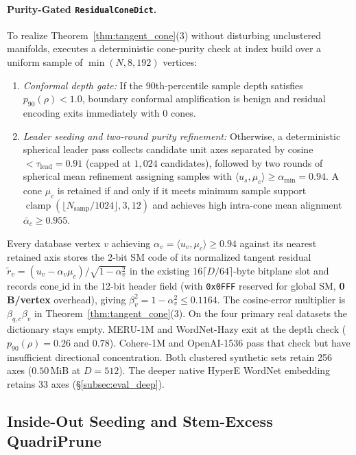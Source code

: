 \paragraph{Purity-Gated \texttt{ResidualConeDict}.}
To realize Theorem~\ref{thm:tangent_cone}(3) without disturbing unclustered manifolds, \rquiver{} executes a deterministic cone-purity check at index build over a uniform sample of $\min(N, 8{,}192)$ vertices:
\begin{enumerate}
  \item \emph{Conformal depth gate:} If the 90th-percentile sample depth satisfies $p_{90}(\rho) < 1.0$, boundary conformal amplification is benign and residual encoding exits immediately with $0$ cones.
  \item \emph{Leader seeding and two-round purity refinement:} Otherwise, a deterministic spherical leader pass collects candidate unit axes separated by cosine $< \tau_{\mathrm{lead}} = 0.91$ (capped at $1{,}024$ candidates), followed by two rounds of spherical mean refinement assigning samples with $\langle u_s, \mu_c\rangle \ge \alpha_{\min} = 0.94$.
  A cone $\mu_c$ is retained if and only if it meets minimum sample support $\operatorname{clamp}(\lfloor N_{\mathrm{samp}}/1024\rfloor, 3, 12)$ and achieves high intra-cone mean alignment $\bar{\alpha}_c \ge 0.955$.
\end{enumerate}
Every database vertex $v$ achieving $\alpha_v = \langle u_v, \mu_c\rangle \ge 0.94$ against its nearest retained axis stores the 2-bit {SM} code of its normalized tangent residual $\tilde{r}_v = (u_v - \alpha_v\mu_c)/\sqrt{1 - \alpha_v^2}$ in the existing $16\lceil D/64\rceil$-byte bitplane slot and records $\text{cone\_id}$ in the 12-bit header field (with \texttt{0x0FFF} reserved for global {SM}, \textbf{0\,B/vertex} overhead), giving $\beta_v^2=1-\alpha_v^2\le0.1164$. The cosine-error multiplier is $\beta_{q,c}\beta_v$ in Theorem~\ref{thm:tangent_cone}(3).
On the four primary real datasets the dictionary stays empty. {MERU-1M} and {WordNet-Hazy} exit at the depth check ($p_{90}(\rho)=0.26$ and $0.78$). {Cohere-1M} and {OpenAI-1536} pass that check but have insufficient directional concentration. Both clustered synthetic sets retain 256 axes ($0.50$\,MiB at $D=512$). The deeper native {HyperE WordNet} embedding retains 33 axes (\S\ref{subsec:eval_deep}).

\subsection{Inside-Out Seeding and Stem-Excess QuadriPrune}
\label{subsec:compass}

